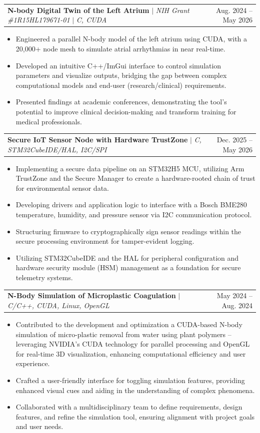 \documentclass[letterpaper,11pt]{article}
\makeatletter
\newcommand{\resumeItem}[1]{
  \item\small{
    {#1 \vspace{-2pt}}
  }
}
\newcommand{\resumeProjectHeading}[2]{
    \item
    \begin{tabular*}{0.97\textwidth}{l@{\extracolsep{\fill}}r}
      \small#1 & #2 \\
    \end{tabular*}\vspace{-7pt}
}
\newcommand{\resumeItemListStart}{\begin{itemize}}
\newcommand{\resumeItemListEnd}{\end{itemize}\vspace{-5pt}}
\makeatother
\begin{document}
      \resumeProjectHeading
    {\textbf{N-body Digital Twin of the Left Atrium} $|$ \emph{NIH Grant \#1R15HL179671-01} $|$ \emph{C, CUDA }}{Aug. 2024 -- May 2026}
        \resumeItemListStart
      \resumeItem{Engineered a parallel N-body model of the left atrium using CUDA, with a 20,000+ node mesh to simulate atrial arrhythmias in near real-time.}
      \resumeItem{Developed an intuitive C++/ImGui interface to control simulation parameters and visualize outputs, bridging the gap between complex computational models and end-user (research/clinical) requirements.}
      \resumeItem{Presented findings at academic conferences, demonstrating the tool's potential to improve clinical decision-making and transform training for medical professionals.}
        \resumeItemListEnd

    \resumeProjectHeading
  {\textbf{Secure IoT Sensor Node with Hardware TrustZone} $|$ \emph{C, STM32CubeIDE/HAL, I2C/SPI}}{Dec. 2025 -- May 2026}
   \resumeItemListStart
   \resumeItem{Implementing a secure data pipeline on an STM32H5 MCU, utilizing Arm TrustZone and the Secure Manager to create a hardware-rooted chain of trust for environmental sensor data.}
   \resumeItem{Developing drivers and application logic to interface with a Bosch BME280 temperature, humidity, and pressure sensor via I2C communication protocol.}
   \resumeItem{Structuring firmware to cryptographically sign sensor readings within the secure processing environment for tamper-evident logging.}
   \resumeItem{Utilizing STM32CubeIDE and the HAL for peripheral configuration and hardware security module (HSM) management as a foundation for secure telemetry systems.}
   \resumeItemListEnd
             
    \resumeProjectHeading
        {\textbf{N-Body Simulation of Microplastic Coagulation} $|$ \emph{C/C++, CUDA, Linux, OpenGL}}{May 2024 -- Aug. 2024}
        \resumeItemListStart
          \resumeItem{Contributed to the development and optimization a CUDA-based N-body simulation of micro-plastic removal from water using plant polymers -- leveraging NVIDIA's CUDA technology for parallel processing and OpenGL for real-time 3D visualization, enhancing computational efficiency and user experience.}
          \resumeItem{Crafted a user-friendly interface for toggling simulation features, providing enhanced visual cues and aiding in the understanding of complex phenomena.}
          \resumeItem{Collaborated with a multidisciplinary team to define requirements, design features, and refine the simulation tool, ensuring alignment with project goals and user needs.}
        \resumeItemListEnd
\end{document}
